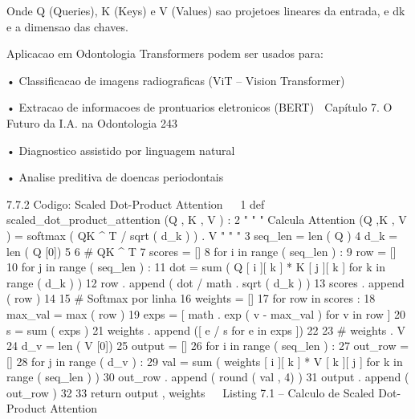          Onde Q (Queries), K (Keys) e V (Values) sao projetoes lineares da entrada, e
dk e a dimensao das chaves.

   Aplicacao em Odontologia Transformers podem ser usados para:

        • Classificacao de imagens radiograficas (ViT – Vision Transformer)

        • Extracao de informacoes de prontuarios eletronicos (BERT)
   Capítulo 7. O Futuro da I.A. na Odontologia                                                 243



           • Diagnostico assistido por linguagem natural

           • Analise preditiva de doencas periodontais


   7.7.2     Codigo: Scaled Dot-Product Attention
                                                                                                    
 1 def scaled_dot_product_attention (Q , K , V ) :
 2     " " " Calcula Attention (Q ,K , V ) = softmax ( QK ^ T / sqrt ( d_k ) ) . V " " "
 3     seq_len = len ( Q )
 4     d_k = len ( Q [0])
 5
 6     # QK ^ T
 7     scores = []
 8     for i in range ( seq_len ) :
 9            row = []
10            for j in range ( seq_len ) :
11                dot = sum ( Q [ i ][ k ] * K [ j ][ k ] for k in range ( d_k ) )
12                row . append ( dot / math . sqrt ( d_k ) )
13            scores . append ( row )
14
15     # Softmax por linha
16     weights = []
17     for row in scores :
18            max_val = max ( row )
19            exps = [ math . exp ( v - max_val ) for v in row ]
20            s = sum ( exps )
21            weights . append ([ e / s for e in exps ])
22
23     # weights . V
24     d_v = len ( V [0])
25     output = []
26     for i in range ( seq_len ) :
27            out_row = []
28            for j in range ( d_v ) :
29                val = sum ( weights [ i ][ k ] * V [ k ][ j ] for k in range ( seq_len ) )
30                out_row . append ( round ( val , 4) )
31            output . append ( out_row )
32
33     return output , weights
                                                                                                    
                      Listing 7.1 – Calculo de Scaled Dot-Product Attention



